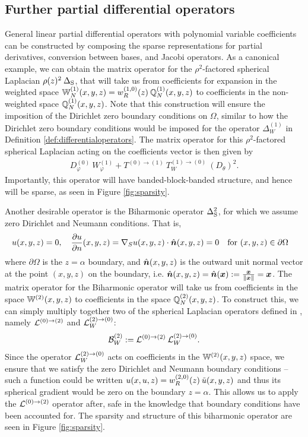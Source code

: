 \documentclass[11pt, oneside]{article}   	%
\begin{document}
\subsection{Further partial differential operators}\label{subsection:furtherdiffoperators}
General linear partial differential operators with polynomial variable coefficients can be constructed by composing the sparse representations for partial derivatives, conversion between bases, and Jacobi operators. As a canonical example, we can obtain the matrix operator for the $\rho^2$-factored spherical Laplacian $\rho(z)^2 \: \DeltaS$, that will take us from coefficients for expansion in the weighted space $\bigW_N^{(1)}(x,y,z) = \genjacw^{(1,0)}(z) \: \bigscopN^{(1)}(x,y,z)$ to coefficients in the non-weighted space $\bigscopN^{(1)}(x,y,z)$. Note that this construction will ensure the imposition of the Dirichlet zero boundary conditions on $\Omega$, similar to how the Dirichlet zero boundary conditions would be imposed for the operator $\Delta^{(1)}_W$ in Definition \ref{def:differentialoperators}. The matrix operator for this $\rho^2$-factored spherical Laplacian acting on the coefficients vector is then given by
\begin{align*}
	D_\varphi^{(0)} \: W_\varphi^{(1)} + T^{(0)\to(1)} \: T_W^{(1)\to(0)} \: (D_\theta)^2.
\end{align*}
Importantly, this operator will have banded-block-banded structure, and hence will be sparse, as seen in Figure \ref{fig:sparsity}.

Another desirable operator is the Biharmonic operator $\DeltaS^2$, for which we assume zero Dirichlet and Neumann conditions. That is, 
\begin{align*}
	u(x,y,z) &= 0, \quad \pfpx{n}{u}(x,y,z) = \nabla_S u(x,y,z) \cdot \unitvec{n}(x,y,z) = 0 \quad \text{for } (x,y,z) \in \partial\Omega
\end{align*}
where $\partial\Omega$ is the $z=\alpha$ boundary, and $\unitvec{n}(x,y,z)$ is the outward unit normal vector at the point $(x,y,z)$ on the boundary, i.e. $\unitvec{n}(x,y,z) = \unitvec{n}(\vec x) := {\vec x \over \norm{\vec x}} = \vec x$. The matrix operator for the Biharmonic operator will take us from coefficients in the space $\bigW^{(2)}(x,y,z)$ to coefficients in the space $\bigscopN^{(2)}(x,y,z)$. To construct this, we can simply multiply together two of the spherical Laplacian operators defined in , namely $\calL^{(0)\to(2)}$ and $\calL_W^{(2)\to(0)}$:
\begin{align*}
	\calB^{(2)}_W := \calL^{(0)\to(2)} \: \calL_W^{(2)\to(0)}.
\end{align*}
Since the operator $\calL_W^{(2)\to(0)}$ acts on coefficients in the $\bigW^{(2)}(x,y,z)$ space, we ensure that we satisfy the zero Dirichlet and Neumann boundary conditions -- such a function could be written $u(x,u,z) = \genjacw^{(2,0)}(z) \: \tilde u(x,y,z)$ and thus its spherical gradient would be zero on the boundary $z = \alpha$. This allows us to apply the $\calL^{(0)\to(2)}$ operator after, safe in the knowledge that boundary conditions have been accounted for. The sparsity and structure of this biharmonic operator are seen in Figure \ref{fig:sparsity}.
\end{document}

